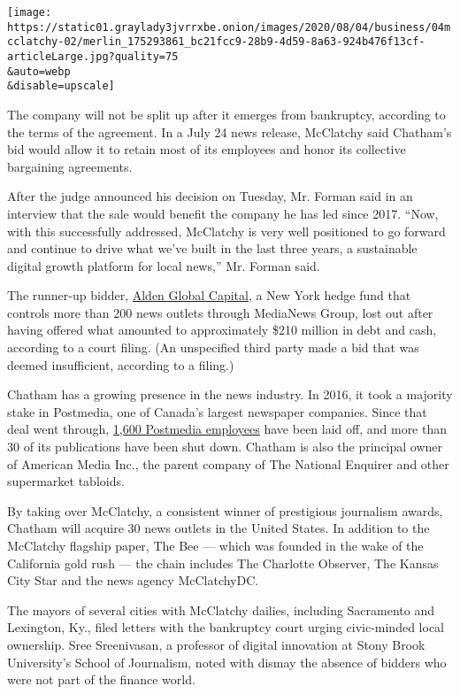 \texttt{[image: https://static01.graylady3jvrrxbe.onion/images/2020/08/04/business/04mcclatchy-02/merlin\_175293861\_bc21fcc9-28b9-4d59-8a63-924b476f13cf-articleLarge.jpg?quality=75\\\&auto=webp\\\&disable=upscale]}

The company will not be split up after it emerges from bankruptcy,
according to the terms of the agreement. In a July 24 news release,
McClatchy said Chatham's bid would allow it to retain most of its
employees and honor its collective bargaining agreements.

After the judge announced his decision on Tuesday, Mr. Forman said in an
interview that the sale would benefit the company he has led since 2017.
``Now, with this successfully addressed, McClatchy is very well
positioned to go forward and continue to drive what we've built in the
last three years, a sustainable digital growth platform for local
news,'' Mr. Forman said.

The runner-up bidder,
\href{https://www.nytimes3xbfgragh.onion/2020/07/02/business/media/tribune-alden-board-seat.html}{Alden
Global Capital}, a New York hedge fund that controls more than 200 news
outlets through MediaNews Group, lost out after having offered what
amounted to approximately \$210 million in debt and cash, according to a
court filing. (An unspecified third party made a bid that was deemed
insufficient, according to a filing.)

Chatham has a growing presence in the news industry. In 2016, it took a
majority stake in Postmedia, one of Canada's largest newspaper
companies. Since that deal went through,
\href{https://www.nytimes3xbfgragh.onion/2020/07/16/business/media/hedge-fund-chatham-mcclatchy-postmedia-newspapers.html}{1,600
Postmedia employees} have been laid off, and more than 30 of its
publications have been shut down. Chatham is also the principal owner of
American Media Inc., the parent company of The National Enquirer and
other supermarket tabloids.

By taking over McClatchy, a consistent winner of prestigious journalism
awards, Chatham will acquire 30 news outlets in the United States. In
addition to the McClatchy flagship paper, The Bee --- which was founded
in the wake of the California gold rush --- the chain includes The
Charlotte Observer, The Kansas City Star and the news agency
McClatchyDC.

The mayors of several cities with McClatchy dailies, including
Sacramento and Lexington, Ky., filed letters with the bankruptcy court
urging civic-minded local ownership. Sree Sreenivasan, a professor of
digital innovation at Stony Brook University's School of Journalism,
noted with dismay the absence of bidders who were not part of the
finance world.

